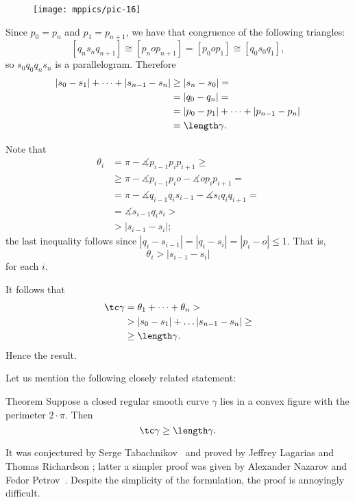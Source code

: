 \begin{figure}[h!]
\vskip-0mm
\centering
\texttt{[image: mppics/pic-16]}
\vskip0mm
\end{figure}

Since $p_0=p_n$ and $p_1=p_{n+1}$, we have that congruence of the following triangles:
\[[q_{n}s_nq_{n+1}]\cong 
[p_nop_{n+1}]=[p_0op_1]\cong[q_{0}s_0q_1],\]
so $s_0q_0q_ns_n$ is a parallelogram.
Therefore
\begin{align*}
|s_0-s_1|+\dots+|s_{n-1}-s_n|
&\ge|s_n-s_0|=
\\
&=|q_0-q_n|=
\\
&=|p_0-p_1|+\dots+|p_{n-1}-p_n|
\\
&=\length \gamma.
\end{align*}

Note that 
\begin{align*}
\theta_i&=\pi-\measuredangle p_{i-1}p_ip_{i+1}\ge
\\
&\ge\pi-\measuredangle p_{i-1}p_io-\measuredangle op_ip_{i+1}=
\\
&=\pi-\measuredangle q_{i-1}q_is_{i-1}-\measuredangle s_iq_iq_{i+1}=
\\
&=\measuredangle s_{i-1}q_is_i>
\\
&>|s_{i-1}-s_i|;
\end{align*}
the last inequality follows since $|q_i-s_{i-1}|=|q_i-s_i|=|p_i-o|\le 1$.
That is, 
\[\theta_i>|s_{i-1}-s_i|\]
for each $i$.

It follows that
\begin{align*}
\tc \gamma
&=\theta_1+\dots+\theta_n>
\\
&> |s_{0}-s_1|+\dots |s_{n-1}-s_n|\ge 
\\
&\ge\length \gamma.
\end{align*}
Hence the result.
\qeds


Let us mention the following closely related statement:

\begin{thm}{Theorem}
Suppose a closed regular smooth curve $\gamma$ lies in a convex figure with the perimeter $2\cdot \pi$.
Then 
\[\tc\gamma\ge \length\gamma.\]

\end{thm}

It was  conjectured by Serge Tabachnikov~\cite{tabachnikov} and proved by Jeffrey Lagarias and Thomas Richardson \cite{lagarias-richardso}; latter a simpler proof was given by Alexander Nazarov and Fedor Petrov~\cite{nazarov-petrov}.
Despite the simplicity of the formulation, the proof is annoyingly difficult.




























